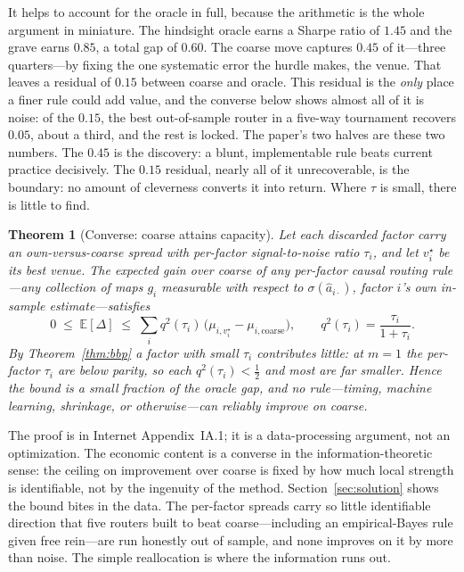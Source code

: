 \documentclass[12pt]{article}
\theoremstyle{plain}
\newtheorem{theorem}{Theorem}
\theoremstyle{definition}
\begin{document}
It helps to account for the oracle in full, because the arithmetic is the whole
argument in miniature. The hindsight oracle earns a Sharpe ratio of $1.45$ and
the grave earns $0.85$, a total gap of $0.60$. The coarse move captures $0.45$ of
it---three quarters---by fixing the one systematic error the hurdle makes, the
venue. That leaves a residual of $0.15$ between coarse and oracle. This residual
is the \emph{only} place a finer rule could add value, and the converse below
shows almost all of it is noise: of the $0.15$, the best out-of-sample router in
a five-way tournament recovers $0.05$, about a third, and the rest is locked.
The paper's two halves are these two numbers. The $0.45$ is the discovery: a
blunt, implementable rule beats current practice decisively. The $0.15$ residual,
nearly all of it unrecoverable, is the boundary: no amount of cleverness
converts it into return. Where $\tau$ is small, there is little to find.

\begin{theorem}[Converse: coarse attains capacity]
\label{thm:capacity}
Let each discarded factor carry an own-versus-coarse spread with per-factor
signal-to-noise ratio $\tau_i$, and let $v^\star_i$ be its best venue. The
expected gain over coarse of any per-factor causal routing rule---any collection
of maps $g_i$ measurable with respect to $\sigma(\hat a_{i\cdot})$, factor $i$'s
own in-sample estimate---satisfies
\[
0\;\le\;\mathbb{E}[\Delta]\;\le\;
\sum_i q^2(\tau_i)\,\bigl(\mu_{i,v^\star_i}-\mu_{i,\text{coarse}}\bigr),
\qquad q^2(\tau_i)=\frac{\tau_i}{1+\tau_i}.
\]
By Theorem~\ref{thm:bbp} a factor with small $\tau_i$ contributes little: at
$m=1$ the per-factor $\tau_i$ are below parity, so each $q^2(\tau_i)<\tfrac12$ and
most are far smaller. Hence the bound is a small fraction of the oracle gap, and
no rule---timing, machine learning, shrinkage, or otherwise---can reliably
improve on coarse.
\end{theorem}

\noindent The proof is in Internet Appendix~IA.1; it is a data-processing
argument, not an optimization. The economic content is a converse in the
information-theoretic sense: the ceiling on improvement over coarse is fixed by
how much local strength is identifiable, not by the ingenuity of the method.
Section~\ref{sec:solution} shows the bound bites in the data. The per-factor
spreads carry so little identifiable direction that five routers built to beat
coarse---including an empirical-Bayes rule given free rein---are run honestly out
of sample, and none improves on it by more than noise. The simple reallocation is
where the information runs out.
\end{document}
